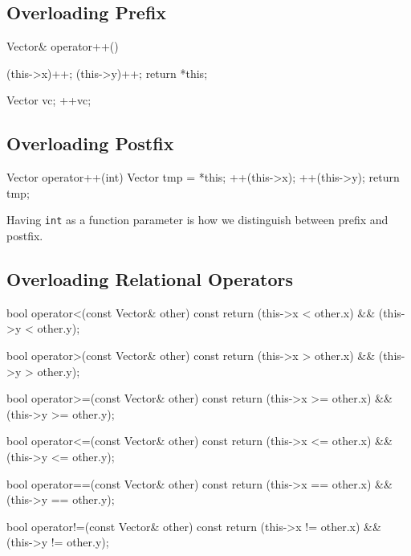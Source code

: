\documentclass{report}
\begin{document}
    \bigbreak \noindent 
    \subsection{Overloading Prefix}
    \bigbreak \noindent 
    \begin{cppcode}
     Vector& operator++() {
            (this->x)++;
            (this->y)++;
            return *this;

    }
    Vector vc;
    ++vc;
    \end{cppcode}

    \bigbreak \noindent 
    \subsection{Overloading Postfix}
    \bigbreak \noindent 
    \begin{cppcode}
    Vector operator++(int) {
            Vector tmp = *this;
            ++(this->x);
            ++(this->y);
            return  tmp;
    }
    \end{cppcode}
    \bigbreak \noindent 
    \begin{notebox}
        Having \texttt{int} as a function parameter is how we distinguish  between prefix and postfix.
    \end{notebox}

    \pagebreak
    \subsection{Overloading Relational Operators}
    \bigbreak \noindent 
    \begin{cppcode}
    bool operator<(const Vector& other) const {
        return (this->x < other.x) && (this->y < other.y);
    }

    bool operator>(const Vector& other) const {
        return (this->x > other.x) && (this->y > other.y);
    }

    bool operator>=(const Vector& other) const {
        return (this->x >= other.x) && (this->y >= other.y);
    }

    bool operator<=(const Vector& other) const {
        return (this->x <= other.x) && (this->y <= other.y);
    }

    bool operator==(const Vector& other) const {
        return (this->x == other.x) && (this->y == other.y);
    }

    bool operator!=(const Vector& other) const {
        return (this->x != other.x) && (this->y != other.y);
    }
    \end{cppcode}
\end{document}
